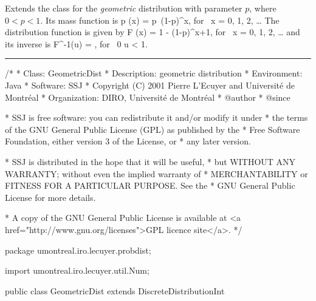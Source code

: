 
Extends the class  for
the {\em geometric\/} distribution
\cite[page 322]{sLAW00a} with parameter
$p$, where $0 < p < 1$.
Its mass function is
\eq
 p (x) = p\, (1-p)^x, \qquad \mbox{for } x = 0, 1, 2, \ldots
\endeq
The distribution function is given by
\eq
   F (x) = 1 - (1-p)^{x+1}, \qquad \mbox{for } x = 0, 1, 2, \ldots
\endeq
and its inverse is
\eq
   F^{-1}(u) = \left\lfloor {}
                \right\rfloor,
               \qquad \mbox{for }  0 \le u < 1.
\endeq


\bigskip\hrule

\begin{code}
\begin{hide}
/*
 * Class:        GeometricDist
 * Description:  geometric distribution
 * Environment:  Java
 * Software:     SSJ 
 * Copyright (C) 2001  Pierre L'Ecuyer and Université de Montréal
 * Organization: DIRO, Université de Montréal
 * @author       
 * @since

 * SSJ is free software: you can redistribute it and/or modify it under
 * the terms of the GNU General Public License (GPL) as published by the
 * Free Software Foundation, either version 3 of the License, or
 * any later version.

 * SSJ is distributed in the hope that it will be useful,
 * but WITHOUT ANY WARRANTY; without even the implied warranty of
 * MERCHANTABILITY or FITNESS FOR A PARTICULAR PURPOSE.  See the
 * GNU General Public License for more details.

 * A copy of the GNU General Public License is available at
   <a href="http://www.gnu.org/licenses">GPL licence site</a>.
 */
\end{hide}
package umontreal.iro.lecuyer.probdist;
\begin{hide}
import  umontreal.iro.lecuyer.util.Num;\end{hide}

public class GeometricDist extends DiscreteDistributionInt\begin{hide} {

   private double p;
   private double vp;
\end{hide}\end{code}

